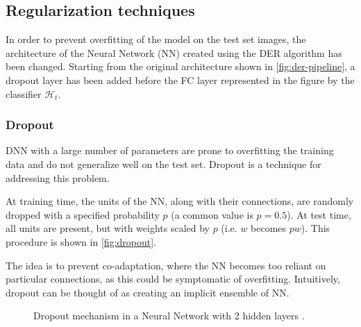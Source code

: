 \subsection{Regularization techniques}
In order to prevent overfitting of the model on the test set images, the architecture of the Neural Network (NN) created using the DER algorithm has been changed. Starting from the original architecture shown in \autoref{fig:der-pipeline}, a dropout layer has been added before the FC layer represented in the figure by the classifier $\mathcal{H}_t$.

\subsubsection{Dropout}
DNN with a large number of parameters are prone to overfitting the training data and do not generalize well on the test set.
Dropout \cite{srivastava2014dropout} is a technique for addressing this problem.

At training time, the units of the NN, along with their connections, are randomly dropped with a specified probability $p$ (a common value is $p = 0.5$). At test time, all units are present, but with weights scaled by $p$ (i.e. $w$ becomes $pw$). This procedure is shown in \autoref{fig:dropout}.

The idea is to prevent co-adaptation, where the NN becomes too reliant on particular connections, as this could be symptomatic of overfitting. Intuitively, dropout can be thought of as creating an implicit ensemble of NN.

\begin{figure}%
	\centering
	\hspace*{2cm}
	\caption{Dropout mechanism in a Neural Network with 2 hidden layers \cite{srivastava2014dropout}.}%
	\label{fig:dropout}%
\end{figure}

